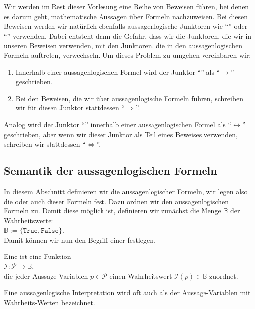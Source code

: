 \remark
Wir werden im Rest dieser Vorlesung eine Reihe von Beweisen führen, bei denen es darum geht,
mathematische Aussagen über Formeln nachzuweisen.  Bei diesen Beweisen werden wir natürlich
ebenfalls aussagenlogische Junktoren wie ``'' oder 
``'' verwenden.  Dabei entsteht dann die Gefahr, dass wir die Junktoren,
die wir in unseren Beweisen verwenden, mit den Junktoren, die in den aussagenlogischen Formeln
auftreten, verwechseln.  Um dieses Problem zu umgehen vereinbaren wir:
\begin{enumerate}
\item Innerhalb einer aussagenlogischen Formel wird der Junktor  
      ``'' als ``$\rightarrow$''  geschrieben.
\item Bei den Beweisen, die wir über aussagenlogische Formeln führen, schreiben wir für diesen
      Junktor stattdessen ``$\Rightarrow$''.
\end{enumerate}
Analog wird der Junktor ``'' innerhalb einer aussagenlogischen Formel als
``$\leftrightarrow$'' geschrieben, aber wenn wir dieser Junktor als Teil eines Beweises verwenden,
schreiben wir stattdessen ``$\Leftrightarrow$''. \eox

\subsection{Semantik der aussagenlogischen Formeln}
In diesem Abschnitt definieren wir die  aussagenlogischer Formeln, wir legen also die
 oder auch  dieser Formeln fest.  Dazu ordnen wir den aussagenlogischen
Formeln  zu.  Damit diese möglich ist, definieren wir
zunächst die Menge $\mathbb{B}$ der Wahrheitswerte:  \\[0.2cm] 
\hspace*{1.3cm} $\mathbb{B} := \{ \texttt{True}, \texttt{False} \}$. \\[0.2cm]
Damit können wir nun
den Begriff einer  festlegen.

\begin{Definition}
  Eine  ist eine Funktion \\[0.2cm]
  \hspace*{1.3cm} $\mathcal{I}:\mathcal{P} \rightarrow \mathbb{B}$, \\[0.2cm]
  die jeder Aussage-Variablen $p\in \mathcal{P}$ einen Wahrheitswert $\mathcal{I}(p) \in \mathbb{B}$ zuordnet.
  \eox
\end{Definition}
Eine aussagenlogische Interpretation wird oft auch als  der
Aussage-Variablen mit Wahr\-heits-Werten bezeichnet.  

